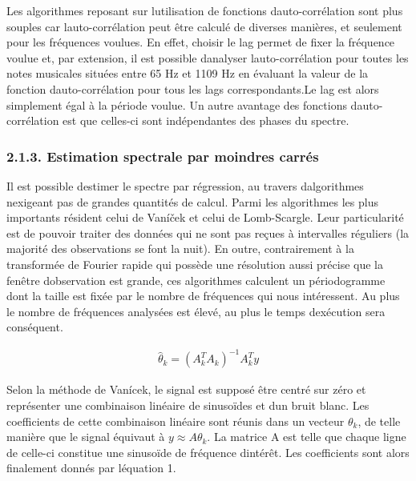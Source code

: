 \documentclass[letterpaper]{article}
\begin{document}
Les algorithmes reposant sur l\textquotesingle utilisation de fonctions d\textquotesingle auto-corrélation sont plus souples
car l\textquotesingle auto-corrélation peut être calculé de diverses manières, et seulement pour les fréquences voulues.
En effet, choisir le lag permet de fixer la fréquence voulue et, par extension, il est possible d\textquotesingle analyser
l\textquotesingle auto-corrélation pour toutes les notes musicales situées entre 65 Hz et 1109 Hz en évaluant la valeur
de la fonction d\textquotesingle auto-corrélation pour tous les lags correspondants.Le lag est alors simplement égal à la période
voulue. Un autre avantage des fonctions d\textquotesingle auto-corrélation est que celles-ci sont indépendantes des phases du spectre.

\subsubsection*{2.1.3. Estimation spectrale par moindres carrés}

Il est possible d\textquotesingle estimer le spectre par régression, au travers d\textquotesingle algorithmes n\textquotesingle exigeant
pas de grandes quantités de calcul. Parmi les algorithmes les plus importants résident celui de Vaníček et celui de Lomb-Scargle. Leur particularité est
de pouvoir traiter des données qui ne sont pas reçues à intervalles réguliers (la majorité des observations se font la nuit). En outre, contrairement à la transformée de Fourier rapide qui possède une résolution aussi précise que la fenêtre d\textquotesingle observation est grande, ces algorithmes
calculent un périodogramme dont la taille est fixée par le nombre de fréquences qui nous intéressent. Au plus le nombre de fréquences analysées est
élevé, au plus le temps d\textquotesingle exécution sera conséquent.

\begin{align}
\hat{\theta}_{k} = (A_{k}^{T} A_{k})^{-1} A_{k}^{T} y
\end{align}

Selon la méthode de Vanícek, le signal est supposé être centré sur zéro et représenter une combinaison linéaire de sinusoïdes et d\textquotesingle un bruit blanc.
Les coefficients de cette combinaison linéaire sont réunis dans un vecteur $\theta_{k}$, de telle manière que le signal équivaut à $y \approx A\theta_{k}$.
La matrice A est telle que chaque ligne de celle-ci constitue une sinusoïde de fréquence d\textquotesingle intérêt. Les coefficients sont alors finalement
donnés par l\textquotesingle équation 1. \citep{PS}\\
\end{document}
